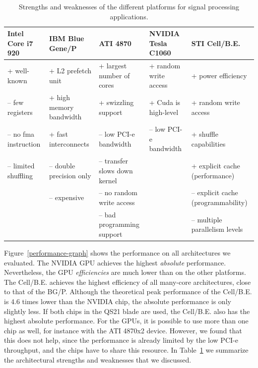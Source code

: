 \documentclass{article}
\begin{document}
\begin{table}[t]
\begin{center}
{\footnotesize
\begin{tabular}{l|l|l|l|l}
Intel Core i7 920     & IBM Blue Gene/P          & ATI 4870                      & NVIDIA Tesla C1060     & STI  Cell/B.E.                      \\
\hline
 + well-known         &  + L2 prefetch unit      &  + largest number of cores    &  + random write access &  + power efficiency                 \\
-- few registers      &  + high memory bandwidth &  + swizzling support          &  + Cuda is high-level  &  + random write access              \\
-- no fma instruction &  + fast interconnects    & -- low PCI-e bandwidth        & -- low PCI-e bandwidth &  + shuffle capabilities             \\
-- limited shuffling  & -- double precision only & -- transfer slows down kernel &                        &  + explicit cache (performance)     \\
                      & -- expensive             & -- no random write access     &                        & -- explicit cache (programmability) \\
                      &                          & -- bad programming support    &                        & -- multiple parallelism levels      \\
\end{tabular}
} %
\end{center}
\vspace{-0.5cm}
\caption{Strengths and weaknesses of the different platforms for signal processing applications.}
\label{architecture-results-table}
\end{table}

Figure~\ref{performance-graph} shows the performance on all
architectures we evaluated. The NVIDIA GPU achieves the highest
\emph{absolute} performance. Nevertheless, the GPU \emph{efficiencies}
are much lower than on the other platforms.  The \mbox{Cell/B.E.}
achieves the highest efficiency of all many-core architectures, close
to that of the BG/P. Although the theoretical peak performance of the
\mbox{Cell/B.E.} is 4.6 times lower than the NVIDIA chip, the absolute
performance is only slightly less.  If both chips in the QS21 blade
are used, the \mbox{Cell/B.E.} also has the highest absolute
performance. For the GPUs, it is possible to use more than one chip as
well, for instance with the ATI 4870x2 device. However, we found that this does not help, since the
performance is already limited by the low PCI-e throughput, and the
chips have to share this resource.
In Table~\ref{architecture-results-table} we summarize the
architectural strengths and weaknesses that we discussed.  
\end{document}
